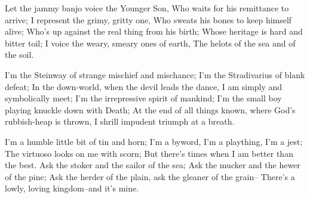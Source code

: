 \begin{poemblock}
 Let the jammy banjo voice the Younger Son,
  Who waits for his remittance to arrive;
 I represent the grimy, gritty one,
  Who sweats his bones to keep himself alive;
 Who's up against the real thing from his birth;
  Whose heritage is hard and bitter toil;
 I voice the weary, smeary ones of earth,
  The helots of the sea and of the soil.

 I'm the Steinway of strange mischief and mischance;
  I'm the Stradivarius of blank defeat;
 In the down-world, when the devil leads the dance,
  I am simply and symbolically meet;
 I'm the irrepressive spirit of mankind;
  I'm the small boy playing knuckle down with Death;
 At the end of all things known, where God's rubbish-heap is thrown,
  I shrill impudent triumph at a breath.

 I'm a humble little bit of tin and horn;
  I'm a byword, I'm a plaything, I'm a jest;
 The virtuoso looks on me with scorn;
  But there's times when I am better than the best.
 Ask the stoker and the sailor of the sea;
  Ask the mucker and the hewer of the pine;
 Ask the herder of the plain, ask the gleaner of the grain--
  There's a lowly, loving kingdom--and it's mine.
\end{poemblock}
